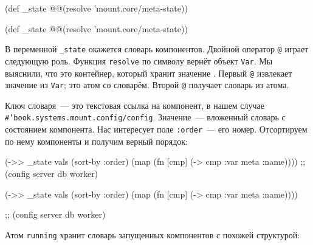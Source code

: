 \ifnarrow

\begin{english}
  \begin{clojure}
(def _state
  @@(resolve 'mount.core/meta-state))
  \end{clojure}
\end{english}

\else

\begin{english}
  \begin{clojure}
(def _state @@(resolve 'mount.core/meta-state))
  \end{clojure}
\end{english}

\fi


В переменной \verb|_state| окажется словарь компонентов. Двойной оператор
\verb|@| играет следующую роль. Функция \verb|resolve| по символу вернёт
объект \verb|Var|. Мы выяснили, что это контейнер, который хранит
значение . Первый \verb|@| извлекает значение из
\verb|Var|; это атом со словарём. Второй \verb|@| получает словарь из атома.

Ключ словаря~--- это текстовая ссылка на компонент, в нашем случае
\texttt{\#'book.systems.mount\-.config/config}. Значение~--- вложенный словарь с
состоянием компонента. Нас интересует поле \verb|:order|~--- его
номер. Отсортируем по нему компоненты и получим верный порядок:

\ifafive

\begin{english}
  \begin{clojure}
(->> _state
     vals (sort-by :order)
     (map (fn [cmp]
            (-> cmp :var meta :name))))
;; (config server db worker)
  \end{clojure}
\end{english}

\else

\begin{english}
  \begin{clojure}
(->> _state
     vals
     (sort-by :order)
     (map (fn [cmp]
            (-> cmp :var meta :name))))

;; (config server db worker)
  \end{clojure}
\end{english}

\fi

Атом \verb|running| хранит словарь запущенных компонентов с похожей структурой:

